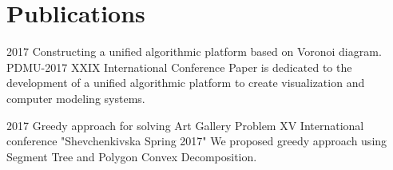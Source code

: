 \documentclass[letterpaper]{twentysecondcv} %
\begin{document}
\section{Publications}
\begin{twenty}
	\twentyitem
    	{2017}
        {Constructing a unified algorithmic platform based on Voronoi diagram.}
        {}
        {PDMU-2017 XXIX International Conference}
        {Paper is dedicated to the development of a unified algorithmic platform to create visualization and computer modeling systems.}
\end{twenty}
\begin{twenty}
	\twentyitem
    	{2017}
        {Greedy approach for solving Art Gallery Problem}
        {}
        {XV International conference "Shevchenkivska Spring 2017"}
        {We proposed greedy approach using Segment Tree and Polygon Convex Decomposition.}
\end{twenty}
\end{document}
